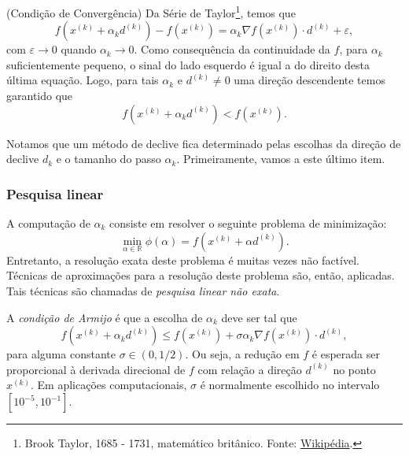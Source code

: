 \begin{obs}(Condição de Convergência)
  Da Série de Taylor\footnote{Brook Taylor, 1685 - 1731, matemático britânico. Fonte: \href{https://pt.wikipedia.org/wiki/Brook_Taylor}{Wikipédia}.}, temos que
  \begin{equation}
    f(x^{(k)}+\alpha_kd^{(k)}) - f(x^{(k)}) = \alpha_k\nabla f(x^{(k)})\cdot d^{(k)} + \varepsilon,
  \end{equation}
  com $\varepsilon\to 0$ quando $\alpha_k\to 0$. Como consequência da continuidade da $f$, para $\alpha_k$ suficientemente pequeno, o sinal do lado esquerdo é igual a do direito desta última equação. Logo, para tais $\alpha_k$ e $d^{(k)}\neq 0$ uma direção descendente temos garantido que
  \begin{equation}
    f(x^{(k)}+\alpha_kd^{(k)}) < f(x^{(k)}).
  \end{equation}
\end{obs}


Notamos que um método de declive fica determinado pelas escolhas da direção de declive $d_k$ e o tamanho do passo $\alpha_k$. Primeiramente, vamos a este último item.

\subsubsection{Pesquisa linear}

A computação de $\alpha_k$ consiste em resolver o seguinte problema de minimização:
\begin{equation}
  \min_{\alpha\in\mathbb{R}} \phi(\alpha) = f(x^{(k)}+\alpha d^{(k)}).
\end{equation}
Entretanto, a resolução exata deste problema é muitas vezes não factível. Técnicas de aproximações para a resolução deste problema são, então, aplicadas. Tais técnicas são chamadas de \emph{pesquisa linear não exata}.

A \emph{condição de Armijo} é que a escolha de $\alpha_k$ deve ser tal que
\begin{equation} \label{eq:condArmijo}
  f(x^{(k)}+\alpha_k d^{(k)}) \leq f(x^{(k)}) + \sigma \alpha_k \nabla f(x^{(k)})\cdot d^{(k)},
\end{equation}
para alguma constante $\sigma\in (0, 1/2)$. Ou seja, a redução em $f$ é esperada ser proporcional à derivada direcional de $f$ com relação a direção $d^{(k)}$ no ponto $x^{(k)}$. Em aplicações computacionais, $\sigma$ é normalmente escolhido no intervalo $[10^{-5}, 10^{-1}]$. 

